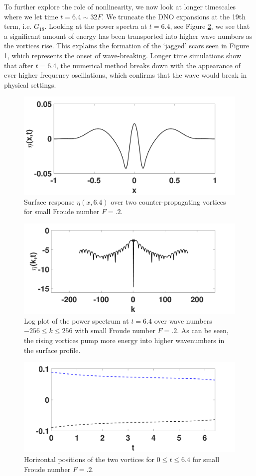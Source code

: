 \documentclass[a4paper,11pt]{article}
\begin{document}
To further explore the role of nonlinearity, we now look at longer timescales where we let time $t = 6.4 \sim 32 F$.  We truncate the DNO expansions at the 19th term, i.e. $G_{18}$.  Looking at the power spectra at $t=6.4$, see Figure \ref{fig:pspecFpt2}, we see that a significant amount of energy has been transported into higher wave numbers as the vortices rise.  This explains the formation of the `jagged' scars seen in Figure \ref{fig:surfrepFpt2}, which represents the onset of wave-breaking.  Longer time simulations show that after $t=6.4$, the numerical method breaks down with the appearance of ever higher frequency oscillations, which confirms that the wave would break in physical settings.  
\begin{figure}[!h]
\centering
\includegraphics[width=.75\textwidth]{surf_resp_mu_pt2_F_pt2_tf_6pt4}
\caption{Surface response $\eta(x,6.4)$ over two counter-propagating vortices for small Froude number $F=.2$.}
\label{fig:surfrepFpt2}
\end{figure}
\begin{figure}[!h]
\centering
\includegraphics[width=.75\textwidth]{pspec_mu_pt2_F_pt2_tf_6pt4}
\caption{Log plot of the power spectrum at $t = 6.4$ over wave numbers $-256\leq k \leq 256$ with small Froude number $F=.2$.  As can be seen, the rising vortices pump more energy into higher wavenumbers in the surface profile.}
\label{fig:pspecFpt2}
\end{figure}
\begin{figure}[!h]
\centering
\includegraphics[width=.75\textwidth]{xtrack_mu_pt2_F_pt2_tf_6pt4}
\caption{Horizontal positions of the two vortices for $0\leq t \leq 6.4$ for small Froude number $F=.2$.}
\end{figure}
\end{document}
